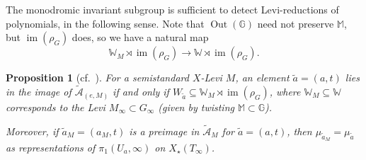 \documentclass[openany]{amsbook}
\newtheorem{proposition}[theorem]{Proposition}
\theoremstyle{definition}
\theoremstyle{remark}
\numberwithin{equation}{section}
\newcommand{\G}{\mathbb{G}}
\newcommand{\W}{\mathbb{W}}
\newcommand{\cA}{\mathcal{A}}
\newcommand{\im}{\operatorname{im}}
\renewcommand{\-}{\operatorname{-}}
\newcommand{\Out}{\operatorname{Out}}
\newcommand{\wtilde}[1]{\widetilde{#1}}
\newcommand{\M}{\mathbb{M}}
\newcommand{\ctA}{\widetilde{\cA}}
\newcommand{\ctAt}[2]{\ctA_{(#1,#2)}}
\begin{document}
The monodromic invariant subgroup is sufficient to detect Levi-reductions of polynomials, in the following sense. Note that $\Out(\G)$ need not preserve $\M$, but $\im(\rho_G)$ does, so we have a natural map 
$$
    \W_M \rtimes \im(\rho_G) \to \W \rtimes \im(\rho_G).
$$

\begin{proposition}[{{cf.\ \cite[Prop. 8.2.1]{CLII}}}]\label{prop.ngo.comparison.wa}
    For a semistandard $X$-Levi $M$, an element $\wtilde{a} = (a,t)$ lies in the image of $\ctAt{e}{M}$ if and only if $W_{\wtilde{a}} \subseteq \W_M \rtimes \im(\rho_G)$, where $\W_M \subseteq \W$ corresponds to the Levi $M_\infty \subset G_{\infty}$ (given by twisting $\M \subset \G$). 
    
        
    Moreover, if $\wtilde{a}_M = (a_M, t)$ is a preimage in $\ctA_M$ for $\wtilde{a} = (a,t)$, then $\mu_{\wtilde{a}_M} = \mu_{\wtilde{a}}$ as representations of $\pi_1(U_a, \infty)$ on $X_\star(T_\infty)$. 
\end{proposition}
\end{document}
